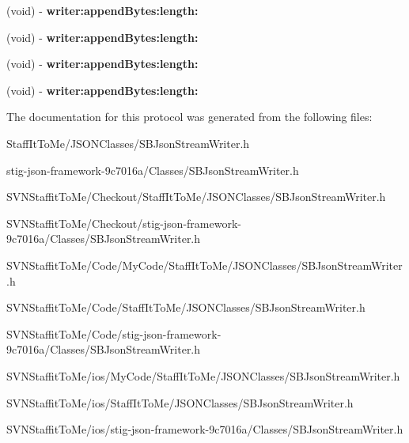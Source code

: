 \begin{DoxyCompactItemize}
\item 
\hypertarget{protocol_s_b_json_stream_writer_delegate-p_a969263873e164a2c1032fb26ff92faac}{
(void) -\/ {\bfseries writer\-:append\-Bytes\-:length\-:}}
\label{protocol_s_b_json_stream_writer_delegate-p_a969263873e164a2c1032fb26ff92faac}

\item 
\hypertarget{protocol_s_b_json_stream_writer_delegate-p_a969263873e164a2c1032fb26ff92faac}{
(void) -\/ {\bfseries writer\-:append\-Bytes\-:length\-:}}
\label{protocol_s_b_json_stream_writer_delegate-p_a969263873e164a2c1032fb26ff92faac}

\item 
\hypertarget{protocol_s_b_json_stream_writer_delegate-p_a969263873e164a2c1032fb26ff92faac}{
(void) -\/ {\bfseries writer\-:append\-Bytes\-:length\-:}}
\label{protocol_s_b_json_stream_writer_delegate-p_a969263873e164a2c1032fb26ff92faac}

\item 
\hypertarget{protocol_s_b_json_stream_writer_delegate-p_a969263873e164a2c1032fb26ff92faac}{
(void) -\/ {\bfseries writer\-:append\-Bytes\-:length\-:}}
\label{protocol_s_b_json_stream_writer_delegate-p_a969263873e164a2c1032fb26ff92faac}

\end{DoxyCompactItemize}


\-The documentation for this protocol was generated from the following files\-:\begin{DoxyCompactItemize}
\item 
\-Staff\-It\-To\-Me/\-J\-S\-O\-N\-Classes/\-S\-B\-Json\-Stream\-Writer.\-h\item 
stig-\/json-\/framework-\/9c7016a/\-Classes/\-S\-B\-Json\-Stream\-Writer.\-h\item 
\-S\-V\-N\-Staffit\-To\-Me/\-Checkout/\-Staff\-It\-To\-Me/\-J\-S\-O\-N\-Classes/\-S\-B\-Json\-Stream\-Writer.\-h\item 
\-S\-V\-N\-Staffit\-To\-Me/\-Checkout/stig-\/json-\/framework-\/9c7016a/\-Classes/\-S\-B\-Json\-Stream\-Writer.\-h\item 
\-S\-V\-N\-Staffit\-To\-Me/\-Code/\-My\-Code/\-Staff\-It\-To\-Me/\-J\-S\-O\-N\-Classes/\-S\-B\-Json\-Stream\-Writer.\-h\item 
\-S\-V\-N\-Staffit\-To\-Me/\-Code/\-Staff\-It\-To\-Me/\-J\-S\-O\-N\-Classes/\-S\-B\-Json\-Stream\-Writer.\-h\item 
\-S\-V\-N\-Staffit\-To\-Me/\-Code/stig-\/json-\/framework-\/9c7016a/\-Classes/\-S\-B\-Json\-Stream\-Writer.\-h\item 
\-S\-V\-N\-Staffit\-To\-Me/ios/\-My\-Code/\-Staff\-It\-To\-Me/\-J\-S\-O\-N\-Classes/\-S\-B\-Json\-Stream\-Writer.\-h\item 
\-S\-V\-N\-Staffit\-To\-Me/ios/\-Staff\-It\-To\-Me/\-J\-S\-O\-N\-Classes/\-S\-B\-Json\-Stream\-Writer.\-h\item 
\-S\-V\-N\-Staffit\-To\-Me/ios/stig-\/json-\/framework-\/9c7016a/\-Classes/\-S\-B\-Json\-Stream\-Writer.\-h\end{DoxyCompactItemize}
